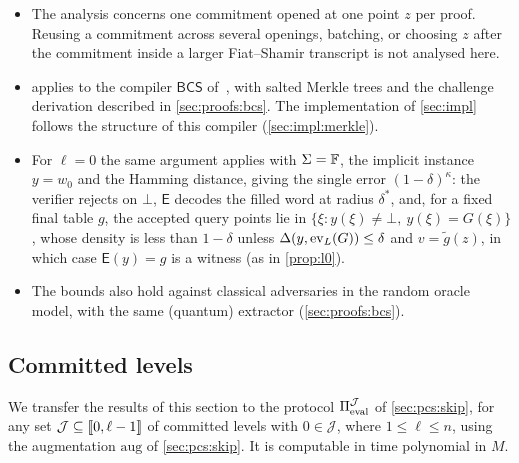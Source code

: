 \begin{remark}[Scope]\label{rem:fs}
\begin{itemize}
  \item The analysis concerns one commitment opened at one point $z$ per proof. Reusing a commitment across several openings, batching, or choosing $z$ after the commitment inside a larger Fiat--Shamir transcript is not analysed here.
  \item {} applies to the compiler $\mathsf{BCS}$ of~\cite[Construction~11.7]{CDHZ25}, with salted Merkle trees and the challenge derivation described in \cref{sec:proofs:bcs}. The implementation of \cref{sec:impl} follows the structure of this compiler (\cref{sec:impl:merkle}).
  \item For $\ell = 0$ the same argument applies with $\Sigma = \mathbb{F}$, the implicit instance $y = w_0$ and the Hamming distance, giving the single error $(1-\delta)^{\kappa}$: the verifier rejects on $\bot$, $\mathsf{E}$ decodes the filled word at radius $\delta^*$, and, for a fixed final table $g$, the accepted query points lie in $\{\xi : y(\xi) \ne \bot,\ y(\xi) = G(\xi)\}$, whose density is less than $1-\delta$ unless $\Delta(y, \mathrm{ev}_L(G)) \le \delta$ and $v = \tilde g(z)$, in which case $\mathsf{E}(y) = g$ is a witness (as in \cref{prop:l0}).
  \item The bounds also hold against classical adversaries in the random oracle model, with the same (quantum) extractor (\cref{sec:proofs:bcs}).
\end{itemize}
\end{remark}

\subsection{Committed levels}\label{sec:sound:skip}

We transfer the results of this section to the protocol $\Pi_{\mathrm{eval}}^{\mathcal{J}}$ of \cref{sec:pcs:skip}, for any set $\mathcal{J} \subseteq \llbracket 0, \ell-1 \rrbracket$ of committed levels with $0 \in \mathcal{J}$, where $1 \le \ell \le n$, using the augmentation $\mathrm{aug}$ of \cref{sec:pcs:skip}.
It is computable in time polynomial in $M$.

